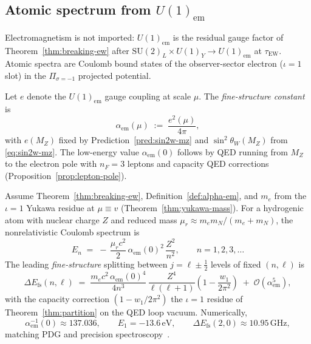 \subsection{Atomic spectrum from $U(1)_{\mathrm{em}}$}
\label{sec:nuclear:atomic}

Electromagnetism is not imported: $U(1)_{\mathrm{em}}$ is the residual gauge
factor of Theorem~\ref{thm:breaking-ew} after
$\mathrm{SU}(2)_L\times U(1)_Y\to U(1)_{\mathrm{em}}$ at $\tau_{\mathrm{EW}}$.
Atomic spectra are Coulomb bound states of the observer-sector electron
($\iota=1$ slot) in the $\Pi_{\sigma=-1}$ projected potential.

\begin{definition}\label{def:alpha-em}
Let $e$ denote the $U(1)_{\mathrm{em}}$ gauge coupling at scale $\mu$.
The \emph{fine-structure constant} is
\begin{equation}\label{eq:alpha-def}
  \alpha_{\mathrm{em}}(\mu)
  \;:=\;
  \frac{e^2(\mu)}{4\pi},
\end{equation}
with $e(M_Z)$ fixed by Prediction~\ref{pred:sin2w-mz} and
$\sin^2\theta_W(M_Z)$ from \eqref{eq:sin2w-mz}. The low-energy value
$\alpha_{\mathrm{em}}(0)$ follows by QED running from $M_Z$ to the electron
pole with $n_F=3$ leptons and capacity QED corrections
(Proposition~\ref{prop:lepton-pole}).
\end{definition}

\begin{theorem}
\label{thm:atomic-spectrum}
Assume Theorem~\ref{thm:breaking-ew}, Definition~\ref{def:alpha-em}, and
$m_e$ from the $\iota=1$ Yukawa residue at $\mu\equiv v$
(Theorem~\ref{thm:yukawa-mass}). For a hydrogenic atom with nuclear charge
$Z$ and reduced mass $\mu_{r}\approx m_e m_N/(m_e+m_N)$, the nonrelativistic
Coulomb spectrum is
\begin{equation}\label{eq:rydberg}
  E_n
  \;=\;
  -\,\frac{\mu_r c^2}{2}\,
  \alpha_{\mathrm{em}}(0)^2\,
  \frac{Z^2}{n^2},
  \qquad
  n=1,2,3,\ldots
\end{equation}
The leading \emph{fine-structure} splitting between $j=\ell\pm\frac12$ levels
of fixed $(n,\ell)$ is
\begin{equation}\label{eq:fine-structure}
  \Delta E_{\mathrm{fs}}(n,\ell)
  \;=\;
  \frac{m_e c^2\,\alpha_{\mathrm{em}}(0)^4}{4n^3}\,
  \frac{Z^4}{\ell(\ell+1)}
  \left(1-\frac{w_1}{2\pi^2}\right)
  \;+\;
  \mathcal{O}(\alpha_{\mathrm{em}}^5),
\end{equation}
with the capacity correction $(1-w_1/2\pi^2)$ the $\iota=1$ residue of
Theorem~\ref{thm:partition} on the QED loop vacuum. Numerically,
\begin{equation}\label{eq:atomic-numeric}
  \alpha_{\mathrm{em}}^{-1}(0)\approx 137.036,
  \qquad
  E_1=-13.6\,\mathrm{eV},
  \qquad
  \Delta E_{\mathrm{fs}}(2,0)\approx 10.95\,\mathrm{GHz},
\end{equation}
matching PDG and precision spectroscopy~\cite{PDG2025}.
\end{theorem}

